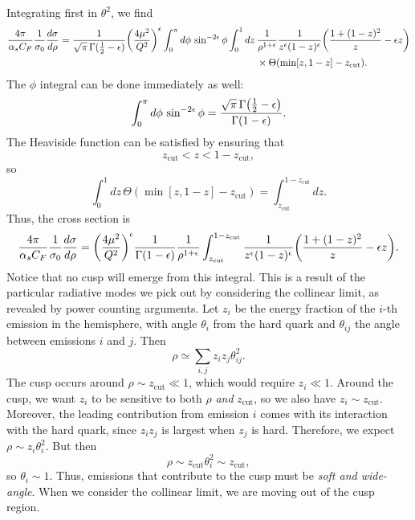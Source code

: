 \documentclass[11pt,twoside,reqno]{amsart}
\theoremstyle{plain}
\theoremstyle{remark}
\theoremstyle{definition}
\theoremstyle{remark}
\theoremstyle{definition}
\theoremstyle{definition}
\newcommand{\zcut}{z_\mathrm{cut}}
\begin{document}
	Integrating first in $\theta^2$, we find
	\begin{equation}
	\begin{aligned}
		\frac{4\pi}{\alpha_s C_F}\frac{1}{\sigma_0} \frac{d\sigma}{d\rho} = \frac{1}{\sqrt{\pi} \, \Gamma(\frac{1}{2} - \epsilon)} \qty(\frac{4 \mu^2}{Q^2})^\epsilon \int_0^{\pi} d\phi\, \sin^{-2\epsilon}\phi \int_0^1 dz\, &\frac{1}{\rho^{1 + \epsilon}} \frac{1}{z^\epsilon (1 - z)^\epsilon} \qty(\frac{1 + (1 - z)^2}{z} - \epsilon z) \\
			&\times \Theta(\min[z, 1 - z] - \zcut).
	\end{aligned}
	\end{equation}
	The $\phi$ integral can be done immediately as well:
	\begin{equation}
		\int_0^\pi d\phi \,\sin^{-2\epsilon}\phi = \frac{\sqrt{\pi}\,\Gamma\qty(\frac{1}{2} - \epsilon)}{\Gamma(1 - \epsilon)}.
	\end{equation}
	The Heaviside function can be satisfied by ensuring that
	\begin{equation}
		\zcut < z < 1 - \zcut,
	\end{equation}
	so
	\begin{equation}
		\int_0^1 dz\, \Theta(\min[z, 1 - z] - \zcut) = \int_{\zcut}^{1 - \zcut}dz.
	\end{equation}
	Thus, the cross section is
	\begin{equation}
		\frac{4\pi}{\alpha_s C_F}\frac{1}{\sigma_0} \frac{d\sigma}{d\rho} = \qty(\frac{4\mu^2}{Q^2})^\epsilon \frac{1}{\Gamma(1 - \epsilon)}\frac{1}{\rho^{1+\epsilon}} \int_{\zcut}^{1 - \zcut} \frac{1}{z^\epsilon (1 - z)^\epsilon} \qty(\frac{1 + (1 - z)^2}{z} - \epsilon z).
	\end{equation} 
	Notice that no cusp will emerge from this integral. This is a result of the particular radiative modes we pick out by considering the collinear limit, as revealed by power counting arguments. Let $z_i$ be the energy fraction of the $i$-th emission in the hemisphere, with angle $\theta_i$ from the hard quark and $\theta_{ij}$ the angle between emissions $i$ and $j$. Then
	\begin{equation}
		\rho \simeq \sum_{i,j}z_i z_j\theta_{ij}^2.
	\end{equation}
	The cusp occurs around $\rho \sim \zcut \ll 1$, which would require $z_i \ll 1$. Around the cusp, we want $z_i$ to be sensitive to both $\rho$ \textit{and} $\zcut$, so we also have $z_i \sim \zcut$. Moreover, the leading contribution from emission $i$ comes with its interaction with the hard quark, since $z_i z_j$ is largest when $z_j$ is hard. Therefore, we expect $\rho \sim z_i \theta_i^2$. But then
	\begin{equation}
		\rho \sim \zcut \theta_i^2 \sim \zcut,
	\end{equation}
	so $\theta_i \sim 1$. Thus, emissions that contribute to the cusp must be \textit{soft and wide-angle}. When we consider the collinear limit, we are moving out of the cusp region.
\end{document}
